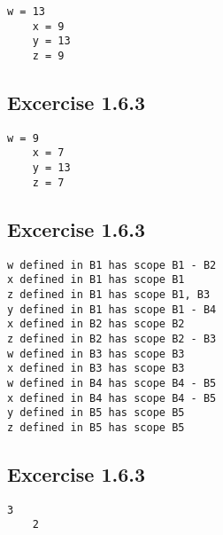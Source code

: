 \documentclass{article}
\begin{document}
\begin{Verbatim}[frame=single]
    w = 13
    x = 9
    y = 13
    z = 9
\end{Verbatim}

\subsection*{Excercise 1.6.3}

\begin{Verbatim}[frame=single]
    w = 9
    x = 7
    y = 13
    z = 7
\end{Verbatim}

\subsection*{Excercise 1.6.3}
\begin{Verbatim}
w defined in B1 has scope B1 - B2
x defined in B1 has scope B1
z defined in B1 has scope B1, B3
y defined in B1 has scope B1 - B4
x defined in B2 has scope B2
z defined in B2 has scope B2 - B3
w defined in B3 has scope B3
x defined in B3 has scope B3
w defined in B4 has scope B4 - B5
x defined in B4 has scope B4 - B5
y defined in B5 has scope B5
z defined in B5 has scope B5
\end{Verbatim}

\subsection*{Excercise 1.6.3}
    \begin{Verbatim}[frame=single]
    3
    2
    \end{Verbatim}
\end{document}

